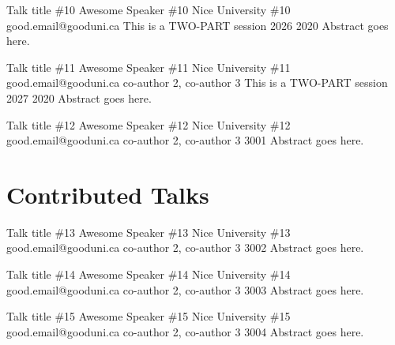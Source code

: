 \begin{talk}
	{Talk title \#10}%
	{Awesome Speaker \#10}%
	{Nice University \#10}%
	{good.email@gooduni.ca}%
	{}%
	{This is a TWO-PART session}%
	{}%
	{2026}%
	{2020}%
	Abstract goes here.
\end{talk}

\begin{talk}
	{Talk title \#11}%
	{Awesome Speaker \#11}%
	{Nice University \#11}%
	{good.email@gooduni.ca}%
	{co-author 2, co-author 3}%
	{This is a TWO-PART session}%
	{}%
	{2027}%
	{2020}%
	Abstract goes here.
\end{talk}

\begin{talk}
	{Talk title \#12}%
	{Awesome Speaker \#12}%
	{Nice University \#12}%
	{good.email@gooduni.ca}%
	{co-author 2, co-author 3}%
	{}%
	{}%
	{3001}%
	{}%
	Abstract goes here.
\end{talk}

\section{Contributed Talks}

\begin{talk}
	{Talk title \#13}%
	{Awesome Speaker \#13}%
	{Nice University \#13}%
	{good.email@gooduni.ca}%
	{co-author 2, co-author 3}%
	{}%
	{}%
	{3002}%
	{}%
	Abstract goes here.
\end{talk}

\begin{talk}
	{Talk title \#14}%
	{Awesome Speaker \#14}%
	{Nice University \#14}%
	{good.email@gooduni.ca}%
	{co-author 2, co-author 3}%
	{}%
	{}%
	{3003}%
	{}%
	Abstract goes here.
\end{talk}

\begin{talk}
	{Talk title \#15}%
	{Awesome Speaker \#15}%
	{Nice University \#15}%
	{good.email@gooduni.ca}%
	{co-author 2, co-author 3}%
	{}%
	{}%
	{3004}%
	{}%
	Abstract goes here.
\end{talk}

\fi